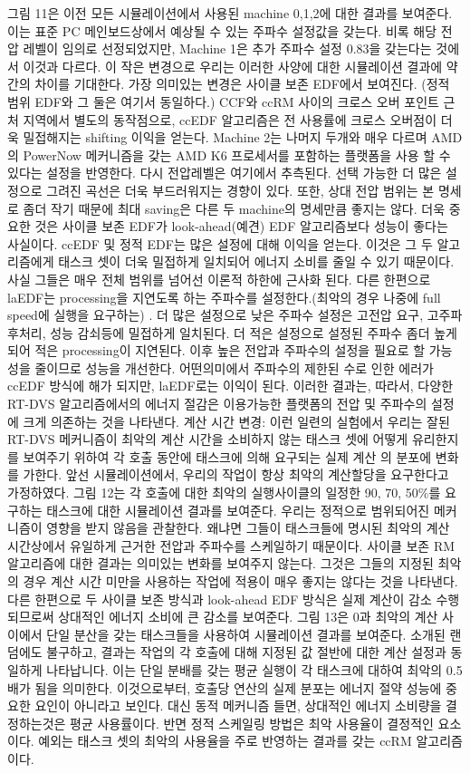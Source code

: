 \documentclass[11pt
  , a4paper
  , article
  , oneside
]{memoir}
\begin{document}
그림 11은 이전 모든 시뮬레이션에서 사용된 machine 0,1,2에 대한 결과를 보여준다. 이는 표준 PC 메인보드상에서 예상될 수 있는 주파수 설정값을 갖는다. 비록 해당 전압 레벨이 임의로 선정되었지만,
Machine 1은 추가 주파수 설정 0.83을 갖는다는 것에서 이것과 다르다. 이 작은 변경으로 우리는 이러한 사양에 대한 시뮬레이션 결과에 약간의 차이를 기대한다. 가장 의미있는 변경은 사이클 보존 EDF에서 보여진다. (정적 범위 EDF와 그 둘은 여기서 동일하다.) CCF와 ccRM 사이의 크로스 오버 포인트 근처 지역에서 별도의 동작점으로, ccEDF 알고리즘은 전 사용률에 크로스 오버점이 더욱 밀접해지는 shifting 이익을 얻는다. 
Machine 2는 나머지 두개와 매우 다르며 AMD의 PowerNow 메커니즘을 갖는 AMD K6 프로세서를 포함하는 플랫폼을 사용 할 수 있다는 설정을 반영한다. 다시 전압레벨은 여기에서 추측된다.
선택 가능한 더 많은 설정으로 그려진 곡선은 더욱 부드러워지는 경향이 있다. 
또한, 상대 전압 범위는 본 명세로 좀더 작기 때문에 최대 saving은 다른 두 machine의 명세만큼 좋지는 않다. 더욱 중요한 것은 사이클 보존 EDF가 look-ahead(예견) EDF 알고리즘보다 성능이 좋다는 사실이다. ccEDF 및 정적 EDF는 많은 설정에 대해 이익을 얻는다. 이것은 그 두 알고리즘에게 태스크 셋이 더욱 밀접하게 일치되어 에너지 소비를 줄일 수 있기 때문이다. 사실 그들은 매우 전체 범위를 넘어선 이론적 하한에 근사화 된다. 다른 한편으로  laEDF는 processing을 지연도록 하는 주파수를 설정한다.(최악의 경우 나중에 full speed에 실행을 요구하는) .
더 많은 설정으로 낮은 주파수 설정은 고전압 요구, 고주파 후처리, 성능 감쇠등에 밀접하게 일치된다. 더 적은 설정으로 설정된 주파수 좀더 높게되어 적은 processing이 지연된다. 이후 높은 전압과 주파수의 설정을 필요로 할 가능성을 줄이므로 성능을 개선한다. 어떤의미에서 주파수의 제한된 수로 인한 에러가 ccEDF 방식에 해가 되지만, laEDF로는 이익이 된다. 이러한 결과는, 따라서, 다양한 RT-DVS 알고리즘에서의 에너지 절감은 이용가능한 플랫폼의 전압 및 주파수의 설정에 크게 의존하는 것을 나타낸다. 
계산 시간 변경:
이런 일련의 실험에서 우리는 잘된 RT-DVS 메커니즘이 최악의 계산 시간을 소비하지 않는 태스크 셋에 어떻게 유리한지를 보여주기 위하여 각 호출 동안에 태스크에 의해 요구되는 실제 계산 의 분포에 변화를 가한다. 앞선 시뮬레이션에서, 우리의 작업이 항상 최악의 계산할당을 요구한다고 가정하였다. 그림 12는 각 호출에 대한 최악의 실행사이클의 일정한 90, 70, 50\%를 요구하는 태스크에 대한 시뮬레이션 결과를 보여준다. 우리는 정적으로 범위되어진 메커니즘이 영향을 받지 않음을 관찰한다. 왜냐면 그들이 태스크들에 명시된 최악의 계산 시간상에서 유일하게 근거한 전압과 주파수를 스케일하기 때문이다. 사이클 보존 RM 알고리즘에 대한 결과는 의미있는 변화를 보여주지 않는다. 그것은 그들의 지정된 최악의 경우 계산 시간 미만을 사용하는 작업에 적용이 매우 좋지는 않다는 것을 나타낸다. 다른 한편으로 두 사이클 보존 방식과 look-ahead EDF 방식은 실제 계산이 감소 수행되므로써 상대적인 에너지 소비에 큰 감소를 보여준다. 그림 13은 0과 최악의 계산 사이에서 단일 분산을 갖는 태스크들을 사용하여 시뮬레이션 결과를 보여준다. 소개된 랜덤에도 불구하고, 결과는 작업의 각 호출에 대해 지정된 값 절반에 대한 계산 설정과 동일하게 나타납니다. 이는 단일 분배를 갖는 평균 실행이 각 태스크에 대하여 최악의 0.5배가 됨을 의미한다. 이것으로부터, 호출당 연산의 실제 분포는 에너지 절약 성능에 중요한 요인이 아니라고 보인다. 대신 동적 메커니즘 들면, 상대적인 에너지 소비량을 결정하는것은 평균 사용률이다. 반면 정적 스케일링 방법은 최악 사용율이 결정적인 요소이다. 예외는 태스크 셋의 최악의 사용율을 주로 반영하는 결과를 갖는 ccRM 알고리즘이다.
\end{document}
